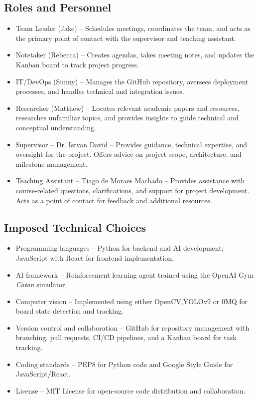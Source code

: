 \documentclass{article}
\begin{document}
\subsection{Roles and Personnel}\label{subsec:roles}
\begin{itemize}
    \item {Team Leader (Jake)} – Schedules meetings, coordinates the team, and acts as the primary point of contact with the supervisor and teaching assistant.
    \item {Notetaker (Rebecca)} – Creates agendas, takes meeting notes, and updates the Kanban board to track project progress.
    \item {IT/DevOps (Sunny)} – Manages the GitHub repository, oversees deployment processes, and handles technical and integration issues.
    \item {Researcher (Matthew)} – Locates relevant academic papers and resources, researches unfamiliar topics, and provides insights to guide technical and conceptual understanding.
    \item {Supervisor – Dr. Istvan David} – Provides guidance, technical expertise, and oversight for the project. Offers advice on project scope, architecture, and milestone management.
    \item {Teaching Assistant – Tiago de Moraes Machado} – Provides assistance with course-related questions, clarifications, and support for project development. Acts as a point of contact for feedback and additional resources.
\end{itemize}

\subsection{Imposed Technical Choices}\label{subsec:technicalchoices}
\begin{itemize}
    \item {Programming languages} – Python for backend and AI development; JavaScript with React for frontend implementation.
    \item {AI framework} – Reinforcement learning agent trained using the OpenAI Gym \emph{Catan} simulator.
    \item {Computer vision} – Implemented using either OpenCV,YOLOv9 or 0MQ for board state detection and tracking.
    \item {Version control and collaboration} – GitHub for repository management with branching, pull requests, CI/CD pipelines, and a Kanban board for task tracking.
    \item {Coding standards} – PEP8 for Python code and Google Style Guide for JavaScript/React.
    \item {License} – MIT License for open-source code distribution and collaboration.
\end{itemize}
\end{document}
